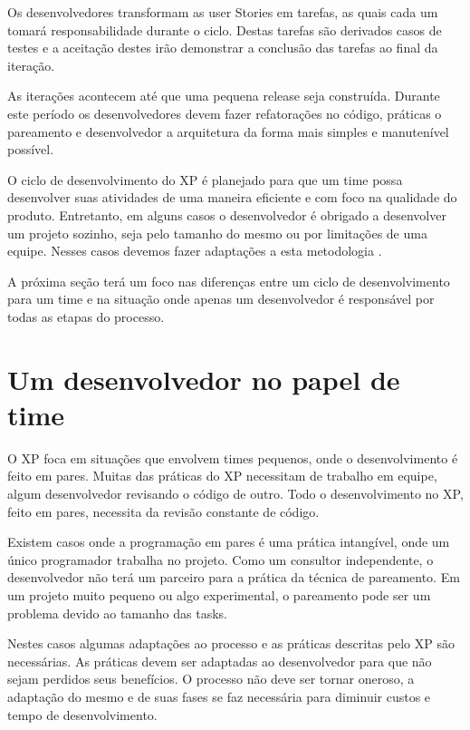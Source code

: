 Os desenvolvedores transformam as user Stories em tarefas, as quais cada um tomará responsabilidade durante o ciclo. Destas tarefas são derivados casos de testes e a aceitação  destes irão demonstrar a conclusão das tarefas ao final da iteração. \cite{Beck:1999}

As iterações acontecem até que uma pequena release seja construída. Durante este período os desenvolvedores devem fazer refatorações no código, práticas o pareamento e desenvolvedor a arquitetura da forma mais simples e manutenível possível. \cite{Beck:2004}

O ciclo de desenvolvimento do XP é planejado para que um time possa desenvolver suas atividades de uma maneira eficiente e com foco na qualidade do produto. Entretanto, em alguns casos o desenvolvedor é obrigado a desenvolver um projeto sozinho, seja pelo tamanho do mesmo ou por limitações de uma equipe. Nesses casos devemos fazer adaptações a esta metodologia .

A próxima seção terá um foco nas diferenças entre um ciclo de desenvolvimento para um time e na situação onde apenas um desenvolvedor é responsável por todas as etapas do processo.

\section{Um desenvolvedor no papel de time}

O XP foca em situações que envolvem times pequenos, onde o desenvolvimento é feito em pares. Muitas das práticas do XP necessitam de trabalho em equipe, algum desenvolvedor revisando o código de outro. Todo o desenvolvimento no XP, feito em pares, necessita da revisão constante de código. \cite{Ron:2000}

Existem casos onde a programação em pares é uma prática intangível, onde um único programador trabalha no projeto. Como um consultor independente, o desenvolvedor não terá um parceiro para a prática da técnica de pareamento. Em um projeto muito pequeno ou algo experimental, o pareamento pode ser um problema devido ao tamanho das tasks. \cite{Agarwal:2008}

Nestes casos algumas adaptações ao processo e as práticas descritas pelo XP são necessárias. As práticas devem ser adaptadas ao desenvolvedor para que não sejam perdidos seus benefícios. O processo não deve ser tornar oneroso, a adaptação do mesmo e de suas fases se faz necessária para diminuir custos e tempo de desenvolvimento. \cite{Bernabe:2015}

